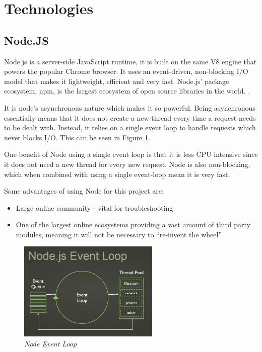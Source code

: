 \section{Technologies}
\subsection{Node.JS}
Node.js is a server-side JavaScript runtime, it is built on the same V8 engine that powers the popular Chrome browser. It uses an event-driven, non-blocking I/O model that makes it lightweight, efficient and very fast. Node.js' package ecosystem, npm, is the largest ecosystem of open source libraries in the world. \citep{Nodejs.org2016}.

It is node's asynchronous nature which makes it so powerful. Being asynchronous essentially means that it does not create a new thread every time a request needs to be dealt with. Instead, it relies on a single event loop to handle requests which never blocks I/O. This can be seen in Figure \ref{fig:event_loop}.

One benefit of Node using a single event loop is that it is less CPU intensive since it does not need a new thread for every new request. Node is also non-blocking, which when combined with using a single event-loop mean it is very fast.

Some advantages of using Node for this project are:

\begin{itemize}
  \item Large online community - vital for troubleshooting
  \item One of the largest online ecosystems providing a vast amount of third party modules, meaning it will not be necessary to ``re-invent the wheel''
\end{itemize}

\begin{figure}[!h]
\centering
\includegraphics*[width=0.6\textwidth]{images/event_loop}
\caption{\em Node Event Loop}
\label{fig:event_loop}
\end{figure}


